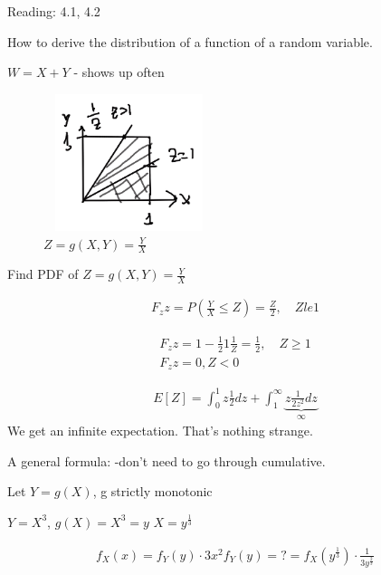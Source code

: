 
Reading: 4.1, 4.2

How to derive the distribution of a function of a random variable.

$W=X+Y$ - shows up often

\begin{figure}[ht]
\centering
\includegraphics[width=5cm, height=4cm]{images/L11/derived_dist_z.jpeg}
\caption{$Z=g(X,Y)=\frac{Y}{X}$}
\end{figure}

Find PDF of $Z=g(X,Y)=\frac{Y}{X}$

\begin{align*}
F_z{z}=P \left(\frac{Y}{X} \le Z \right) = \frac{Z}{2},\quad Z le 1
\end{align*}

\begin{align*}
F_z{z}= 1 - \frac{1}{2}1\frac{1}{Z} = \frac{1}{2},\quad Z \ge 1\\
F_z{z}= 0, Z < 0
\end{align*}

\begin{align*}
E[Z] = \int_0^1 z \frac{1}{2}dz + \int_1^{\infty} \underbrace{z \frac{1}{2 z^2}dz}_{\infty}
\end{align*}
We get an infinite expectation.  That's nothing strange.


A general formula: -don't need to go through cumulative.


Let $Y=g(X)$, g strictly monotonic


$Y=X^3$, $g(X)=X^3 = y$
$X=y^\frac{1}{3}$

\begin{align*}
f_X(x)=f_{Y}(y)\cdot 3x^2
f_Y(y)=?
 = f_X(y^\frac{1}{3}) \cdot \frac{1}{3y^\frac{2}{3}}
\end{align*}

